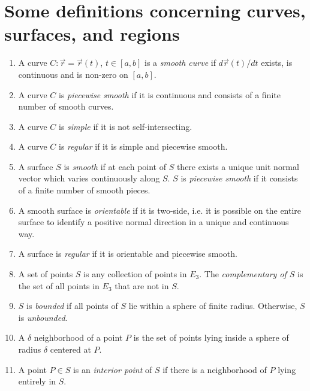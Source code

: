 \chapter{Some definitions concerning curves, surfaces, and regions}
\label{appendix: Some definitions concerning curves, surfaces, and regions}

\begin{enumerate}

\item
A curve $C\colon \vec{r} = \vec{r}(t)$, $t\in[a,b]$ is a \emph{smooth curve} if $d\vec{r}(t)/dt$ exists, is continuous and is non-zero on $[a,b]$. 

\item
A curve $C$ is \emph{piecewise smooth} if it is continuous and consists of a finite number of smooth curves.

\item
A curve $C$ is \emph{simple} if it is not self-intersecting.

\item
A curve $C$ is \emph{regular} if it is simple and piecewise smooth.

\item
A surface $S$ is \emph{smooth} if at each point of $S$ there exists a unique unit normal vector which varies continuously along $S$. $S$ is \emph{piecewise smooth} if it consists of a finite number of smooth pieces. 

\item
A smooth surface is \emph{orientable} if it is two-side, i.e. it is possible on the entire surface to identify a positive normal direction in a unique and continuous way. 

\item
A surface is \emph{regular} if it is orientable and piecewise smooth. 

\item
A set of points $S$ is any collection of points in $E_3$. The \emph{complementary of $S$} is the set of all points in $E_3$ that are not in $S$. 

\item
$S$ is \emph{bounded} if all points of $S$ lie within a sphere of finite radius. Otherwise, $S$ is \emph{unbounded}. 

\item
A $\delta$ neighborhood of a point $P$ is the set of points lying inside a sphere of radius $\delta$ centered at $P$.

\item
A point $P\in S$ is an \emph{interior point} of $S$ if there is a neighborhood of $P$ lying entirely in $S$. 


\end{enumerate}
